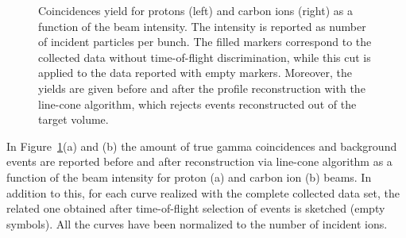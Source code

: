 \begin{figure} [!h]
  \caption{Coincidences yield for protons (left) and carbon ions (right) as a function of the beam intensity. The intensity is reported as number of incident particles per bunch. The filled markers correspond to the collected data without time-of-flight discrimination, while this cut is applied to the data reported with empty markers. Moreover, the yields are given before and after the profile reconstruction with the line-cone algorithm, which rejects events reconstructed out of the target volume.}
  \label{fig:coincidences}
\end{figure}

In Figure~\ref{fig:coincidences}(a) and (b) the amount of true gamma coincidences and background events are reported before and after reconstruction via line-cone algorithm as a function of the beam intensity for proton (a) and carbon ion (b) beams. In addition to this, for each curve realized with the complete collected data set, the related one obtained after time-of-flight selection of events is sketched (empty symbols). All the curves have been normalized to the number of incident ions.

